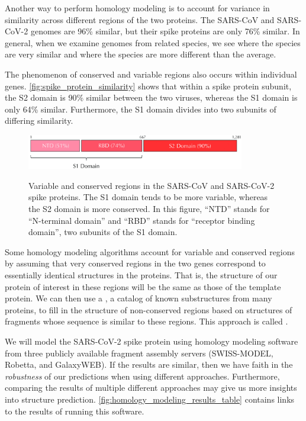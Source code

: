 Another way to perform homology modeling is to account for variance in similarity across different regions of the two proteins. The SARS-CoV and SARS-CoV-2 genomes are 96\% similar, but their spike proteins are only 76\% similar. In general, when we examine genomes from related species, we see  where the species are very similar and  where the species are more different than the average.

The phenomenon of conserved and variable regions also occurs within individual genes. \autoref{fig:spike_protein_similarity} shows that within a spike protein subunit, the S2 domain is 90\% similar between the two viruses, whereas the S1 domain is only 64\% similar. Furthermore, the S1 domain divides into two subunits of differing similarity.

\begin{figure}[h]
	\centering
	\mySfFamily
	\includegraphics[width = 0.85\textwidth]{../images_CMYK/spike_protein_similarity}\\
	\caption{Variable and conserved regions in the SARS-CoV and SARS-CoV-2 spike proteins. The S1 domain tends to be more variable, whereas the S2 domain is more conserved. In this figure, ``NTD'' stands for ``N-terminal domain'' and ``RBD'' stands for ``receptor binding domain'', two subunits of the S1 domain.}
	\label{fig:spike_protein_similarity}
\end{figure}

Some homology modeling algorithms account for variable and conserved regions by assuming that very conserved regions in the two genes correspond to essentially identical structures in the proteins. That is, the structure of our protein of interest in these regions will be the same as those of the template protein. We can then use a , a catalog of known substructures from many proteins, to fill in the structure of non-conserved regions based on structures of fragments whose sequence is similar to these regions. This approach is called .

We will model the SARS-CoV-2 spike protein using homology modeling software from three publicly available fragment assembly servers (SWISS-MODEL, Robetta, and GalaxyWEB). If the results are similar, then we have faith in the \textit{robustness} of our predictions when using different approaches. Furthermore, comparing the results of multiple different approaches may give us more insights into structure prediction. \autoref{fig:homology_modeling_results_table} contains links to the results of running this software.\\

